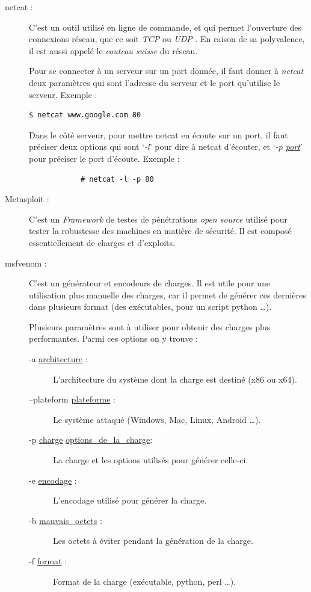     \begin{description}
        \item[netcat :] \label{netcat}
            C'est un outil utilisé en ligne de commande, et qui permet l'ouverture des connexions
            réseau, que ce soit \emph{TCP} \cite{reseau} ou \emph{UDP} \cite{reseau}. En raison de sa polyvalence,
            il est aussi appelé le \emph{couteau suisse} du réseau.

            Pour se connecter à un serveur sur un port donnée, il faut donner à \emph{netcat} deux paramètres qui sont 
            l'adresse du serveur et le port qu'utilise le serveur. Exemple :
            \begin{lstlisting}[language=bash] 
            $ netcat www.google.com 80
            \end{lstlisting}

            Dans le côté serveur, pour mettre netcat en écoute sur un port, il faut préciser deux options qui sont 
            `\emph{-l}' pour dire à netcat d'écouter, et `\emph{-p \ul{port}}' pour préciser le port d'écoute.
            Exemple :
            \begin{lstlisting}
            # netcat -l -p 80   
            \end{lstlisting}

        \item[Metasploit :] C'est un \emph{Framework} de testes de pénétrations \emph{open source} utilisé pour 
            tester la robustesse des machines en matière de sécurité. Il est composé essentiellement de charges 
            et d'exploits. 

        \item[msfvenom :] \label{msfvenom} C'est un générateur et encodeurs de charges. Il est utile pour une utilisation plus manuelle
            des charges, car il permet de générer ces dernières dans plusieurs format (des exécutables, pour un 
            script python \ldots{}). 

            Plusieurs paramètres sont à utiliser pour obtenir des charges plus performantes. Parmi ces options on y
            trouve :
            \begin{description}
                \item[-a \ul{architecture} :] L'architecture du système dont la charge est destiné
                    (x86 ou x64).
                \item[--plateform \ul{plateforme} :] Le système attaqué (Windows, Mac, Linux, Android
                \ldots{}).
                \item[-p \ul{charge} \ul{options\_de\_la\_charge}:] La charge et les options utilisés 
                    pour générer celle-ci.
                \item[-e \ul{encodage} :] L'encodage utilisé pour générer la charge.
                \item[-b \ul{mauvais\_octets} :] Les octets à éviter pendant la génération de la charge.
                \item[-f \ul{format} :] Format de la charge (exécutable, python, perl \ldots{}).
            \end{description}


\end{description}
